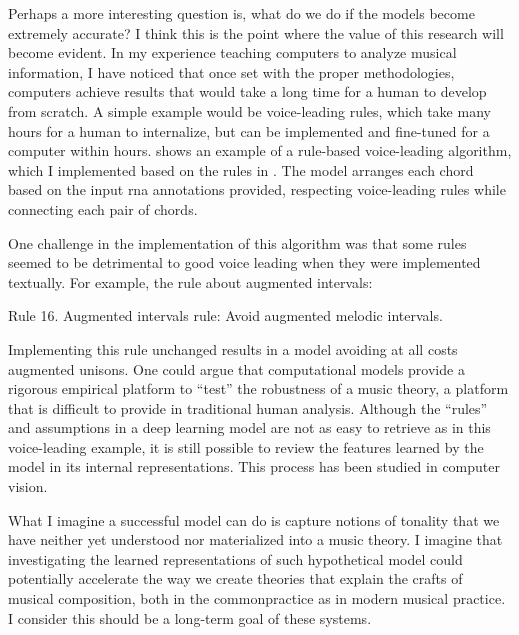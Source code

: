

Perhaps a more interesting question is, what do we do if the
models become extremely accurate? I think this is the point
where the value of this research will become evident. In my
experience teaching computers to analyze musical
information, I have noticed that once set with the proper
methodologies, computers achieve results that would take a
long time for a human to develop from scratch. A simple
example would be voice-leading rules, which take many hours
for a human to internalize, but can be implemented and
fine-tuned for a computer within hours.
 shows an example of a
rule-based voice-leading algorithm, which I implemented
based on the rules in
\textcite[p.~10]{huron2016voice}.
The model arranges each chord based on the input \gls{rna}
annotations provided, respecting voice-leading rules while
connecting each pair of chords. 


One challenge in the implementation of this algorithm was
that some rules seemed to be detrimental to good voice
leading when they were implemented textually. For example,
the rule about augmented intervals:

\begin{italicquotes}
    Rule 16. Augmented intervals rule: Avoid augmented
    melodic intervals.
\end{italicquotes}

Implementing this rule unchanged results in a model avoiding
at all costs augmented unisons. One could argue that
computational models provide a rigorous empirical platform
to ``test'' the robustness of a music theory, a platform
that is difficult to provide in traditional human analysis.
Although the ``rules'' and assumptions in a deep learning
model are not as easy to retrieve as in this voice-leading
example, it is still possible to review the features learned
by the model in its internal representations. This process
has been studied in computer vision.


What I imagine a successful model can do is capture notions
of tonality that we have neither yet understood nor
materialized into a music theory. I imagine that
investigating the learned representations of such
hypothetical model could potentially accelerate the way we
create theories that explain the crafts of musical
composition, both in the \gls{commonpractice} as in modern
musical practice. I consider this should be a long-term goal
of these systems.
